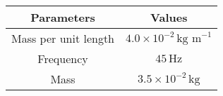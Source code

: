 
    \begin{tabular}{|c|c|}
        \hline
        \textbf{Parameters} & \textbf{Values} \\
        \hline
        Mass per unit length & $4.0 \times 10^{-2} \, \text{kg m}^{-1}$ \\
        \hline
        Frequency & $45 \, \text{Hz}$ \\
        \hline
        Mass & $3.5 \times 10^{-2} \, \text{kg}$ \\
        \hline
    \end{tabular}
    

